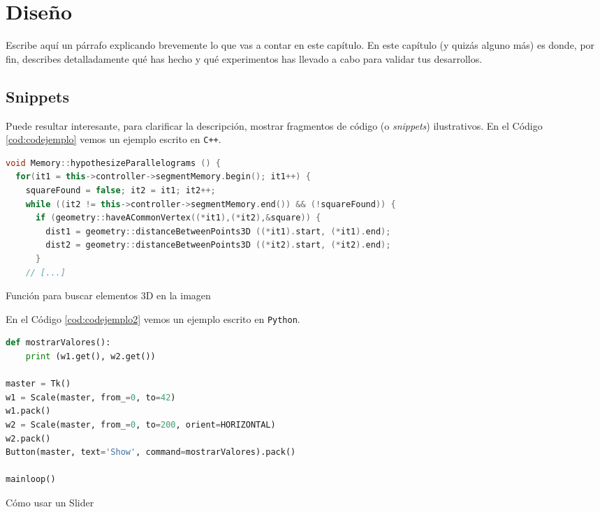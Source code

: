 \chapter{Diseño}
\label{cap:capitulo4}


Escribe aquí un párrafo explicando brevemente lo que vas a contar en este capítulo. En este capítulo (y quizás alguno más) es donde, por fin, describes detalladamente qué has hecho y qué experimentos has llevado a cabo para validar tus desarrollos.

\section{Snippets}

Puede resultar interesante, para clarificar la descripción, mostrar fragmentos de código (o \textit{snippets}) ilustrativos. En el Código \ref{cod:codejemplo} vemos un ejemplo escrito en \texttt{C++}.

\begin{code}[h]
\begin{lstlisting}[language=C++]
void Memory::hypothesizeParallelograms () {
  for(it1 = this->controller->segmentMemory.begin(); it1++) {
    squareFound = false; it2 = it1; it2++;
    while ((it2 != this->controller->segmentMemory.end()) && (!squareFound)) {
      if (geometry::haveACommonVertex((*it1),(*it2),&square)) {
        dist1 = geometry::distanceBetweenPoints3D ((*it1).start, (*it1).end);
        dist2 = geometry::distanceBetweenPoints3D ((*it2).start, (*it2).end);
      }
    // [...]
\end{lstlisting}
\caption[Función para buscar elementos 3D en la imagen]{Función para buscar elementos 3D en la imagen}
\label{cod:codejemplo}
\end{code}

En el Código \ref{cod:codejemplo2} vemos un ejemplo escrito en \texttt{Python}.

\begin{code}[h]
\begin{lstlisting}[language=Python]
def mostrarValores():
    print (w1.get(), w2.get())

master = Tk()
w1 = Scale(master, from_=0, to=42)
w1.pack()
w2 = Scale(master, from_=0, to=200, orient=HORIZONTAL)
w2.pack()
Button(master, text='Show', command=mostrarValores).pack()

mainloop()
\end{lstlisting}
\caption[Cómo usar un Slider]{Cómo usar un Slider}
\label{cod:codejemplo2}
\end{code}

